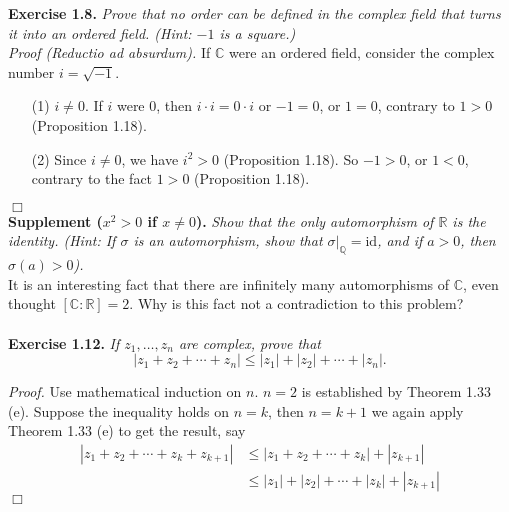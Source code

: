 \documentclass{article}
\begin{document}



\textbf{Exercise 1.8.}
\emph{Prove that no order can be defined in the complex field that turns it
into an ordered field.
(Hint: $-1$ is a square.)} \\

\emph{Proof (Reductio ad absurdum).}
If $\mathbb{C}$ were an ordered field, consider the complex number $i = \sqrt{-1}$.

\begin{enumerate}
\item[(1)]
$i \neq 0$.
If $i$ were $0$, then $i \cdot i = 0 \cdot i$ or $-1 = 0$,
or $1 = 0$, contrary to $1 > 0$ (Proposition 1.18).
\item[(2)]
Since $i \neq 0$, we have $i^2 > 0$ (Proposition 1.18).
So $-1 > 0$, or $1 < 0$, contrary to the fact $1 > 0$ (Proposition 1.18).
\end{enumerate}
$\Box$ \\

\textbf{Supplement ($x^2 > 0$ if $x \neq 0$).}
\emph{Show that the only automorphism of $\mathbb{R}$ is the identity.
(Hint: If $\sigma$ is an automorphism, show that $\sigma|_{\mathbb{Q}} = \text{id}$,
and if $a > 0$, then $\sigma(a) > 0$).} \\

It is an interesting fact that there are infinitely many automorphisms of $\mathbb{C}$,
even thought $[\mathbb{C}:\mathbb{R}] = 2$.
Why is this fact not a contradiction to this problem? \\\\






\textbf{Exercise 1.12.}
\emph{If $z_1, \ldots, z_n$ are complex, prove that
$$|z_1 + z_2 + \cdots + z_n| \leq |z_1| + |z_2| + \cdots + |z_n|.$$}

\emph{Proof.}
Use mathematical induction on $n$. $n = 2$ is established by Theorem 1.33 (e).
Suppose the inequality holds on $n = k$, then $n = k + 1$ we again apply Theorem 1.33 (e)
to get the result, say
\begin{align*}
|z_1 + z_2 + \cdots + z_k + z_{k+1}|
&\leq |z_1 + z_2 + \cdots + z_k| + |z_{k+1}| \\
&\leq |z_1| + |z_2| + \cdots + |z_k| + |z_{k+1}|
\end{align*}
$\Box$ \\
\end{document}
